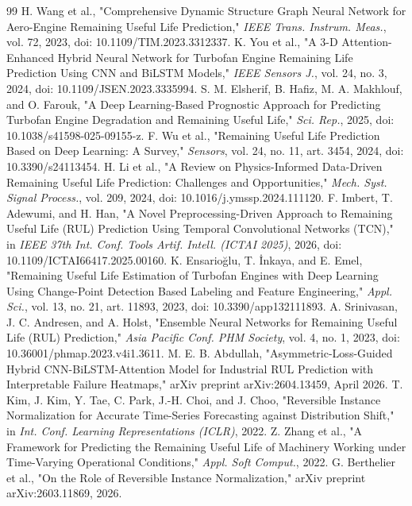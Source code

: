 \documentclass[preprint,10pt]{elsarticle}
\begin{document}
\begin{thebibliography}{99}
  H. Wang et al., "Comprehensive Dynamic Structure Graph Neural Network for Aero-Engine Remaining Useful Life Prediction," \textit{IEEE Trans. Instrum. Meas.}, vol. 72, 2023, doi: 10.1109/TIM.2023.3312337.
  K. You et al., "A 3-D Attention-Enhanced Hybrid Neural Network for Turbofan Engine Remaining Life Prediction Using CNN and BiLSTM Models," \textit{IEEE Sensors J.}, vol. 24, no. 3, 2024, doi: 10.1109/JSEN.2023.3335994.
  S. M. Elsherif, B. Hafiz, M. A. Makhlouf, and O. Farouk, "A Deep Learning-Based Prognostic Approach for Predicting Turbofan Engine Degradation and Remaining Useful Life," \textit{Sci. Rep.}, 2025, doi: 10.1038/s41598-025-09155-z.
  F. Wu et al., "Remaining Useful Life Prediction Based on Deep Learning: A Survey," \textit{Sensors}, vol. 24, no. 11, art. 3454, 2024, doi: 10.3390/s24113454.
  H. Li et al., "A Review on Physics-Informed Data-Driven Remaining Useful Life Prediction: Challenges and Opportunities," \textit{Mech. Syst. Signal Process.}, vol. 209, 2024, doi: 10.1016/j.ymssp.2024.111120.
  F. Imbert, T. Adewumi, and H. Han, "A Novel Preprocessing-Driven Approach to Remaining Useful Life (RUL) Prediction Using Temporal Convolutional Networks (TCN)," in \textit{IEEE 37th Int. Conf. Tools Artif. Intell. (ICTAI 2025)}, 2026, doi: 10.1109/ICTAI66417.2025.00160.
  K. Ensarioğlu, T. İnkaya, and E. Emel, "Remaining Useful Life Estimation of Turbofan Engines with Deep Learning Using Change-Point Detection Based Labeling and Feature Engineering," \textit{Appl. Sci.}, vol. 13, no. 21, art. 11893, 2023, doi: 10.3390/app132111893.
  A. Srinivasan, J. C. Andresen, and A. Holst, "Ensemble Neural Networks for Remaining Useful Life (RUL) Prediction," \textit{Asia Pacific Conf. PHM Society}, vol. 4, no. 1, 2023, doi: 10.36001/phmap.2023.v4i1.3611.
  M. E. B. Abdullah, "Asymmetric-Loss-Guided Hybrid CNN-BiLSTM-Attention Model for Industrial RUL Prediction with Interpretable Failure Heatmaps," arXiv preprint arXiv:2604.13459, April 2026.
  T. Kim, J. Kim, Y. Tae, C. Park, J.-H. Choi, and J. Choo, "Reversible Instance Normalization for Accurate Time-Series Forecasting against Distribution Shift," in \textit{Int. Conf. Learning Representations (ICLR)}, 2022.
  Z. Zhang et al., "A Framework for Predicting the Remaining Useful Life of Machinery Working under Time-Varying Operational Conditions," \textit{Appl. Soft Comput.}, 2022.
  G. Berthelier et al., "On the Role of Reversible Instance Normalization," arXiv preprint arXiv:2603.11869, 2026.

\end{thebibliography}
\end{document}
